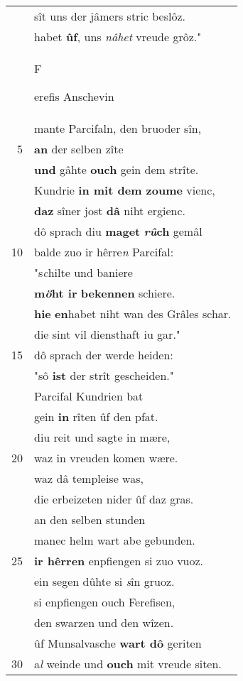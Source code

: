 \documentclass[8pt,a4paper,notitlepage]{article}
\begin{document}
\begin{table}[ht]
\begin{minipage}[t]{0.5\linewidth}
\begin{tabular}{rl}
 & sît uns der jâmers stric beslôz.\\ 
 & habet \textbf{ûf}, uns \textit{nâhet} vreude grôz."\\ 
 & \begin{large}F\end{large}erefis Anschevin\\ 
 & mante Parcifaln, den bruoder sîn,\\ 
5 & \textbf{an} der selben zîte\\ 
 & \textbf{und} gâhte \textbf{ouch} gein dem strîte.\\ 
 & Kundrie \textbf{in mit dem zoume} vienc,\\ 
 & \textbf{daz} sîner jost \textbf{dâ} niht ergienc.\\ 
 & dô sprach diu \textbf{maget} \textbf{\textit{rû}ch} gemâl\\ 
10 & balde zuo ir hêrre\textit{n} Parcifal:\\ 
 & "s\textit{c}hilte und baniere\\ 
 & \textbf{m\textit{ö}ht ir} \textbf{bekennen} schiere.\\ 
 & \textbf{hie} \textbf{en}habet niht wan des Grâles schar.\\ 
 & die sint vil diensthaft iu gar."\\ 
15 & dô sprach der werde heiden:\\ 
 & "sô \textbf{ist} der strît gescheiden."\\ 
 & Parcifal Kundrien bat\\ 
 & gein \textbf{in} rîten ûf den pfat.\\ 
 & diu reit und sagte in mære,\\ 
20 & waz in vreuden komen wære.\\ 
 & waz dâ templeise was,\\ 
 & die erbeizeten nider ûf daz gras.\\ 
 & an den selben stunden\\ 
 & manec helm wart abe gebunden.\\ 
25 & \textbf{ir hêrren} enpfiengen si zuo vuoz.\\ 
 & ein segen dûhte si \textit{s}în gruoz.\\ 
 & si enpfiengen ouch Ferefisen,\\ 
 & den swarzen und den wîzen.\\ 
 & ûf Munsalvasche \textbf{wart dô} geriten\\ 
30 & a\textit{l} weinde und \textbf{ouch} mit vreude siten.\\ 
\end{tabular}

\end{minipage}
\end{table}
\end{document}
